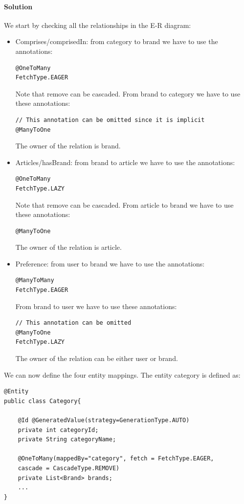 \paragraph*{Solution}
We start by checking all the relationships in the E-R diagram: 
\begin{itemize}
    \item Comprises/comprisedIn: from category to brand we have to use the annotations: 
        \begin{lstlisting}[style=Java]
@OneToMany
FetchType.EAGER
        \end{lstlisting}
        Note that remove can be cascaded. 
        From brand to category we have to use these annotations: 
        \begin{lstlisting}[style=Java]
// This annotation can be omitted since it is implicit
@ManyToOne
        \end{lstlisting}
        The owner of the relation is brand. 
    \item Articles/hasBrand: from brand to article we have to use the annotations: 
        \begin{lstlisting}[style=Java]
@OneToMany
FetchType.LAZY
        \end{lstlisting}
        Note that remove can be cascaded. 
        From article to brand we have to use these annotations: 
        \begin{lstlisting}[style=Java]
@ManyToOne
        \end{lstlisting}
        The owner of the relation is article. 
    \item Preference: from user to brand we have to use the annotations: 
        \begin{lstlisting}[style=Java]
@ManyToMany
FetchType.EAGER
        \end{lstlisting}
        From brand to user we have to use these annotations: 
        \begin{lstlisting}[style=Java]
// This annotation can be omitted
@ManyToOne
FetchType.LAZY
        \end{lstlisting}
        The owner of the relation can be either user or brand. 
\end{itemize}
We can now define the four entity mappings. 
The entity category is defined as:  
\begin{lstlisting}[style=Java]
@Entity
public class Category{

    @Id @GeneratedValue(strategy=GenerationType.AUTO)
    private int categoryId;
    private String categoryName;

    @OneToMany(mappedBy="category", fetch = FetchType.EAGER,
    cascade = CascadeType.REMOVE)
    private List<Brand> brands;
    ...
}
\end{lstlisting}
